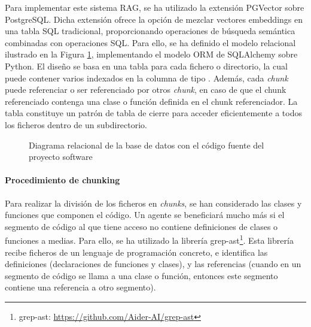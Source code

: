 Para implementar este sistema RAG, se ha utilizado la extensión PGVector sobre PostgreSQL. Dicha extensión ofrece la opción de mezclar vectores embeddings en una tabla SQL tradicional, proporcionando operaciones de búsqueda semántica combinadas con operaciones SQL. Para ello, se ha definido el modelo relacional ilustrado en la Figura \ref{fig:relacional}, implementando el modelo ORM de SQLAlchemy sobre Python. El diseño se basa en una tabla  para cada fichero o directorio, la cual puede contener varios  indexados en la columna  de tipo . Además, cada \textit{chunk} puede referenciar o ser referenciado por otros \textit{chunk}, en caso de que el chunk referenciado contenga una clase o función definida en el chunk referenciador. La tabla  constituye un patrón de tabla de cierre para acceder eficientemente a todos los ficheros dentro de un subdirectorio. 

\begin{figure}[h]
  \centering
  \caption{Diagrama relacional de la base de datos con el código fuente del proyecto software}
  \label{fig:relacional}
\end{figure}

\paragraph{Procedimiento de chunking}
Para realizar la división de los ficheros en \textit{chunks}, se han considerado las clases y funciones que componen el código. Un agente se beneficiará mucho más si el segmento de código al que tiene acceso no contiene definiciones de clases o funciones a medias. Para ello, se ha utilizado la librería grep-ast\footnote{grep-ast: \url{https://github.com/Aider-AI/grep-ast}}. Esta librería recibe ficheros de un lenguaje de programación concreto, e identifica las definiciones (declaraciones de funciones y clases), y las referencias (cuando en un segmento de código se llama a una clase o función, entonces este segmento contiene una referencia a otro segmento). 

